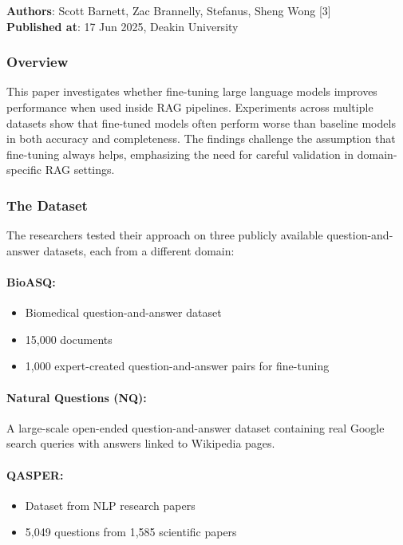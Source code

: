 \documentclass[12pt, a4paper, oneside]{report}
\begin{document}
\textbf{Authors}: Scott Barnett, Zac Brannelly, Stefanus, Sheng Wong [3]\\
\textbf{Published at}: 17 Jun 2025, Deakin University

\subsubsection{Overview}

This paper investigates whether fine-tuning large language models improves performance when used inside RAG pipelines. Experiments across multiple datasets show that fine-tuned models often perform worse than baseline models in both accuracy and completeness. The findings challenge the assumption that fine-tuning always helps, emphasizing the need for careful validation in domain-specific RAG settings.

\subsubsection{The Dataset}

The researchers tested their approach on three publicly available question-and-answer datasets, each from a different domain:

\paragraph{BioASQ:}
\begin{itemize}[noitemsep]
  \item Biomedical question-and-answer dataset
  \item 15,000 documents
  \item 1,000 expert-created question-and-answer pairs for fine-tuning
\end{itemize}

\paragraph{Natural Questions (NQ):}
A large-scale open-ended question-and-answer dataset containing real Google search queries with answers linked to Wikipedia pages.

\paragraph{QASPER:}
\begin{itemize}[noitemsep]
  \item Dataset from NLP research papers
  \item 5,049 questions from 1,585 scientific papers
\end{itemize}
\end{document}
